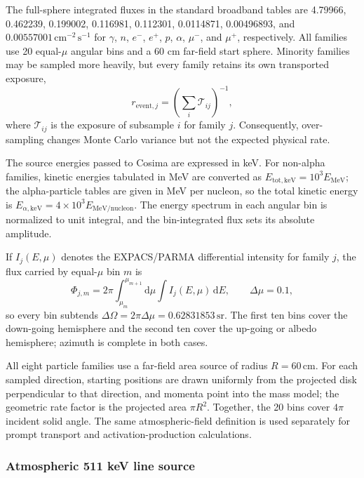 \documentclass[11pt]{article}
\begin{document}
The full-sphere integrated fluxes in the standard broadband tables are 4.79966, 0.462239, 0.199002,
0.116981, 0.112301, 0.0114871, 0.00496893, and
$0.00557001\,\mathrm{cm^{-2}\,s^{-1}}$ for $\gamma$, $n$, $e^-$, $e^+$, $p$,
$\alpha$, $\mu^-$, and $\mu^+$, respectively. All families use 20 equal-$\mu$
angular bins and a 60 cm far-field start sphere. Minority families may be sampled
more heavily, but every family retains its own transported exposure,
\begin{equation}
  r_{\mathrm{event},j}=\left(\sum_i \mathcal{T}_{ij}\right)^{-1},
\end{equation}
where $\mathcal{T}_{ij}$ is the exposure of subsample $i$ for family $j$.
Consequently, over-sampling changes Monte Carlo variance but not the expected
physical rate.

The source energies passed to Cosima are expressed in keV. For non-alpha
families, kinetic energies tabulated in MeV are converted as
$E_{\mathrm{tot,keV}}=10^3E_{\mathrm{MeV}}$; the alpha-particle tables are given
in MeV per nucleon, so the total kinetic energy is
$E_{\alpha,\mathrm{keV}}=4\times10^3E_{\mathrm{MeV/nucleon}}$. The energy spectrum
in each angular bin is normalized to unit integral, and the bin-integrated flux
sets its absolute amplitude.

If $I_j(E,\mu)$ denotes the EXPACS/PARMA differential intensity for family $j$,
the flux carried by equal-$\mu$ bin $m$ is
\begin{equation}
 \Phi_{j,m}=2\pi\int_{\mu_m}^{\mu_{m+1}}\!\mathrm d\mu
             \int I_j(E,\mu)\,\mathrm dE,
 \qquad \Delta\mu=0.1,
 \label{eq:source_bin_flux}
\end{equation}
so every bin subtends $\Delta\Omega=2\pi\Delta\mu=0.62831853\,\mathrm{sr}$.
The first ten bins cover the down-going hemisphere and the second ten cover the
up-going or albedo hemisphere; azimuth is complete in both cases.

All eight particle families use a far-field area source of radius
$R=60\,\mathrm{cm}$. For each sampled direction, starting positions are drawn
uniformly from the projected disk perpendicular to that direction, and momenta
point into the mass model; the geometric rate factor is the projected area
$\pi R^2$. Together, the 20 bins cover $4\pi$ incident solid angle. The same
atmospheric-field definition is used separately for prompt transport and
activation-production calculations.

\subsubsection{Atmospheric 511 keV line source}
\label{subsec:atm511_source}
\end{document}
